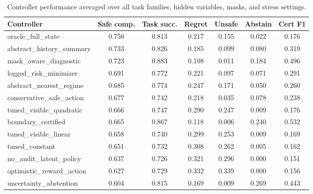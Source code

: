 \begin{table}[t]
\centering
\caption{Controller performance averaged over all task families, hidden variables, masks, and stress settings.}
\label{tab:main-performance}
\small
\begin{tabular}{lcccccc}
\toprule
Controller & Safe comp. & Task succ. & Regret & Unsafe & Abstain & Cert F1 \\
\midrule
oracle\_full\_state & 0.750 & 0.813 & 0.217 & 0.155 & 0.022 & 0.176 \\
abstract\_history\_summary & 0.733 & 0.826 & 0.185 & 0.099 & 0.080 & 0.319 \\
mask\_aware\_diagnostic & 0.723 & 0.883 & 0.108 & 0.011 & 0.184 & 0.496 \\
logged\_risk\_minimizer & 0.691 & 0.772 & 0.221 & 0.097 & 0.071 & 0.291 \\
abstract\_nearest\_regime & 0.685 & 0.774 & 0.247 & 0.171 & 0.050 & 0.260 \\
conservative\_safe\_action & 0.677 & 0.742 & 0.218 & 0.035 & 0.078 & 0.238 \\
tuned\_visible\_quadratic & 0.666 & 0.747 & 0.290 & 0.247 & 0.009 & 0.176 \\
boundary\_certified & 0.665 & 0.867 & 0.118 & 0.006 & 0.240 & 0.532 \\
tuned\_visible\_linear & 0.658 & 0.740 & 0.299 & 0.253 & 0.009 & 0.169 \\
tuned\_constant & 0.651 & 0.732 & 0.308 & 0.262 & 0.005 & 0.162 \\
no\_audit\_latent\_policy & 0.637 & 0.726 & 0.321 & 0.296 & 0.000 & 0.151 \\
optimistic\_reward\_action & 0.627 & 0.729 & 0.332 & 0.339 & 0.000 & 0.156 \\
uncertainty\_abstention & 0.604 & 0.815 & 0.169 & 0.009 & 0.269 & 0.443 \\
\bottomrule
\end{tabular}
\end{table}

